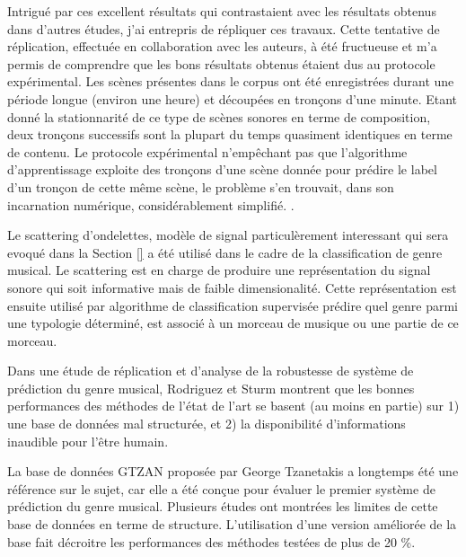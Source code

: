 Intrigué par ces excellent résultats qui contrastaient avec les résultats obtenus dans d'autres études, j'ai entrepris de répliquer ces travaux. Cette tentative de réplication, effectuée en collaboration avec les auteurs, à été fructueuse et m'a permis de comprendre que les bons résultats obtenus étaient dus au protocole expérimental\cite{lagrange2015}. Les scènes présentes dans le corpus ont été enregistrées durant une période longue (environ une heure) et découpées en tronçons d'une minute. Etant donné la stationnarité de ce type de scènes sonores en terme de composition, deux tronçons successifs sont la plupart du temps quasiment identiques en terme de contenu. Le protocole expérimental n'empêchant pas que l'algorithme d'apprentissage exploite des tronçons d'une scène donnée pour prédire le label d'un tronçon de cette même scène, le problème s'en trouvait, dans son incarnation numérique, considérablement simplifié. .

Le scattering d'ondelettes, modèle de signal particulèrement interessant qui sera evoqué dans la Section \ref{} a été utilisé dans le cadre de la classification de genre musical. Le scattering est en charge de produire une représentation du signal sonore qui soit informative mais de faible dimensionalité. Cette représentation est ensuite utilisé par algorithme de classification supervisée prédire quel genre parmi une typologie déterminé, est associé à un morceau de musique ou une partie de ce morceau.

Dans une étude de réplication et d'analyse de la robustesse de système de prédiction du genre musical\cite{rodriguez2016analysing}, Rodriguez et Sturm montrent que les bonnes performances des méthodes de l'état de l'art se basent (au moins en partie) sur 1) une base de données mal structurée, et 2) la disponibilité d'informations inaudible pour l'être humain.

La base de données GTZAN proposée par George Tzanetakis a longtemps été une référence sur le sujet, car elle a été conçue pour évaluer le premier système de prédiction du genre musical\cite{tzanetakis2002musical}. Plusieurs études ont montrées les limites de cette base de données en terme de structure. L'utilisation d'une version améliorée de la base fait décroitre les performances des méthodes testées de plus de 20 \%.

